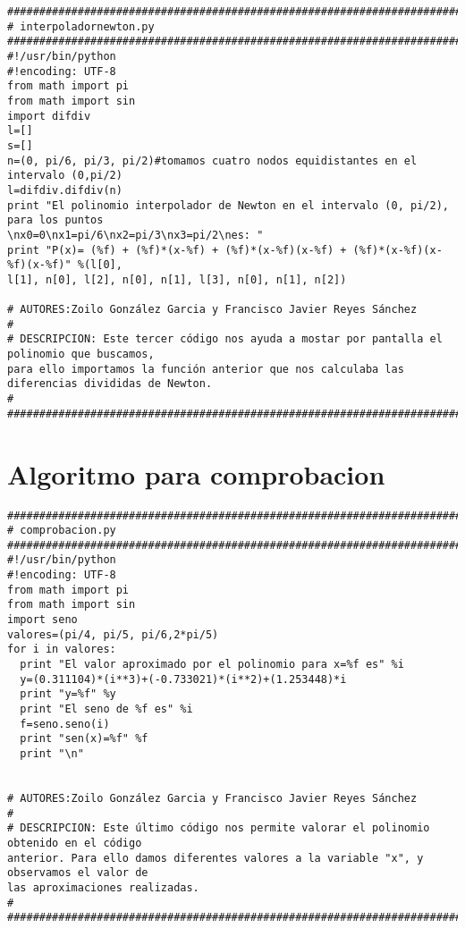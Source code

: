 \begin{center}
\begin{footnotesize}
\begin{verbatim}
###################################################################################
# interpoladornewton.py
###################################################################################
#!/usr/bin/python
#!encoding: UTF-8
from math import pi
from math import sin
import difdiv
l=[]
s=[]
n=(0, pi/6, pi/3, pi/2)#tomamos cuatro nodos equidistantes en el intervalo (0,pi/2)
l=difdiv.difdiv(n)
print "El polinomio interpolador de Newton en el intervalo (0, pi/2), para los puntos
\nx0=0\nx1=pi/6\nx2=pi/3\nx3=pi/2\nes: "
print "P(x)= (%f) + (%f)*(x-%f) + (%f)*(x-%f)(x-%f) + (%f)*(x-%f)(x-%f)(x-%f)" %(l[0],
l[1], n[0], l[2], n[0], n[1], l[3], n[0], n[1], n[2])

# AUTORES:Zoilo González Garcia y Francisco Javier Reyes Sánchez
#  
# DESCRIPCION: Este tercer código nos ayuda a mostar por pantalla el polinomio que buscamos,
para ello importamos la función anterior que nos calculaba las diferencias divididas de Newton.
#
###################################################################################
\end{verbatim}
\end{footnotesize}
\end{center}

\section{Algoritmo para comprobacion}
\label{Apendice4:WWW}

\begin{center}
\begin{footnotesize}
\begin{verbatim}
###################################################################################
# comprobacion.py
###################################################################################
#!/usr/bin/python
#!encoding: UTF-8
from math import pi
from math import sin
import seno
valores=(pi/4, pi/5, pi/6,2*pi/5)
for i in valores:
  print "El valor aproximado por el polinomio para x=%f es" %i
  y=(0.311104)*(i**3)+(-0.733021)*(i**2)+(1.253448)*i
  print "y=%f" %y
  print "El seno de %f es" %i
  f=seno.seno(i)
  print "sen(x)=%f" %f
  print "\n"


# AUTORES:Zoilo González Garcia y Francisco Javier Reyes Sánchez
#  
# DESCRIPCION: Este último código nos permite valorar el polinomio obtenido en el código
anterior. Para ello damos diferentes valores a la variable "x", y observamos el valor de 
las aproximaciones realizadas.
#
###################################################################################
\end{verbatim}
\end{footnotesize}
\end{center}